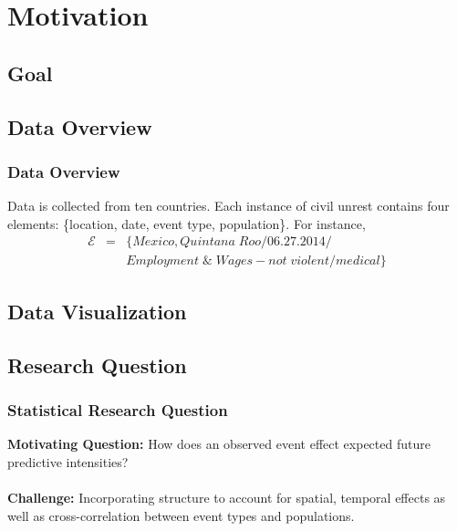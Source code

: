 \documentclass{beamer}
\begin{document}
\section{Motivation}
\subsection{Goal}
\begin{frame}

\end{frame}
\subsection{Data Overview}
\begin{frame}
	\frametitle{Data Overview}
	Data is collected from ten countries. Each instance of civil unrest contains four elements: \{location, date, event type,
	population\}. For instance, 
	\begin{eqnarray*}
	\mathcal{E} &=& \{Mexico,Quintana\; Roo / 06.27.2014 / \\
	&&Employment \;\& \;Wages - not\; violent / medical \} 
	\end{eqnarray*}
	\end{frame}
\subsection{Data Visualization}
\begin{frame}
	\end{frame}
\subsection{Research Question}
\begin{frame}
	\frametitle{Statistical Research Question}
 	{\bf Motivating Question:} How does an observed event effect expected future predictive intensities?
 	\\~\\
	{\bf Challenge:} Incorporating structure to account for spatial, temporal effects as well as 
	cross-correlation between event types and populations.
\end{frame}
\end{document}
